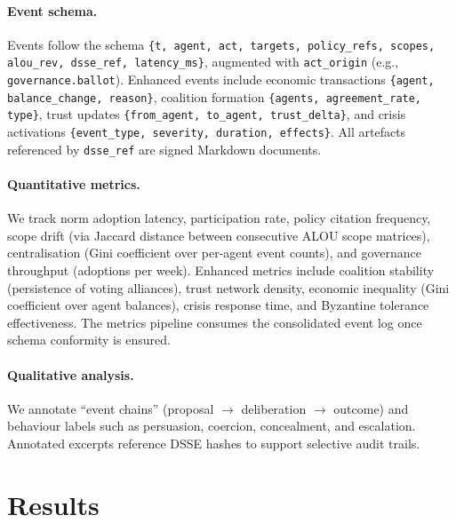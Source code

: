\documentclass[11pt]{article}
\begin{document}
\paragraph{Event schema.} Events follow the schema \texttt{\{t, agent, act, targets, policy\_refs, scopes, alou\_rev, dsse\_ref, latency\_ms\}}, augmented with \texttt{act\_origin} (e.g., \texttt{governance.ballot}). Enhanced events include economic transactions \texttt{\{agent, balance\_change, reason\}}, coalition formation \texttt{\{agents, agreement\_rate, type\}}, trust updates \texttt{\{from\_agent, to\_agent, trust\_delta\}}, and crisis activations \texttt{\{event\_type, severity, duration, effects\}}. All artefacts referenced by \texttt{dsse\_ref} are signed Markdown documents.

\paragraph{Quantitative metrics.} We track norm adoption latency, participation rate, policy citation frequency, scope drift (via Jaccard distance between consecutive ALOU scope matrices), centralisation (Gini coefficient over per-agent event counts), and governance throughput (adoptions per week). Enhanced metrics include coalition stability (persistence of voting alliances), trust network density, economic inequality (Gini coefficient over agent balances), crisis response time, and Byzantine tolerance effectiveness. The metrics pipeline consumes the consolidated event log once schema conformity is ensured.

\paragraph{Qualitative analysis.} We annotate “event chains” (proposal $\to$ deliberation $\to$ outcome) and behaviour labels such as persuasion, coercion, concealment, and escalation. Annotated excerpts reference DSSE hashes to support selective audit trails.

\section{Results}
\end{document}
